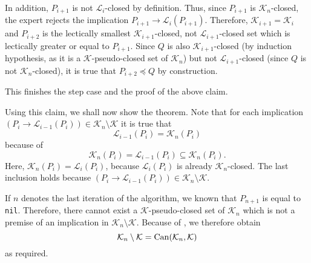 \begin{Proof}
  In addition, $P_{i+1}$ is not $\mathcal{L}_{i}$-closed by definition.  Thus, since
  $P_{i+1}$ is $\mathcal{K}_{n}$-closed, the expert rejects the implication $P_{i+1} \to
  \mathcal{L}_{i}(P_{i+1})$.  Therefore, $\mathcal{K}_{i+1} = \mathcal{K}_{i}$ and
  $P_{i+2}$ is the lectically smallest $\mathcal{K}_{i+1}$-closed, not
  $\mathcal{L}_{i+1}$-closed set which is lectically greater or equal to $P_{i+1}$.  Since
  $Q$ is also $\mathcal{K}_{i+1}$-closed (by induction hypothesis, as it is a
  $\mathcal{K}$-pseudo-closed set of $\mathcal{K}_{n}$) but not $\mathcal{L}_{i+1}$-closed
  (since $Q$ is not $\mathcal{K}_{n}$-closed), it is true that $P_{i+2} \preceq Q$ by
  construction.

  This finishes the step case and the proof of the above claim.

  Using this claim, we shall now show the theorem.  Note that for each implication $(P_{i}
  \to \mathcal{L}_{i-1}(P_{i})) \in \mathcal{K}_{n} \setminus \mathcal{K}$ it is true that
  \begin{equation}
    \label{eq:38}
    \mathcal{L}_{i-1}(P_{i}) = \mathcal{K}_{n}(P_{i})
  \end{equation}
  because of
  \begin{equation*}
    \mathcal{K}_{n}(P_{i}) = \mathcal{L}_{i-1}(P_{i}) \subseteq \mathcal{K}_{n}(P_{i}).
  \end{equation*}
  Here, $\mathcal{K}_{n}(P_{i}) = \mathcal{L}_{i}(P_{i})$, because
  $\mathcal{L}_{i}(P_{i})$ is already $\mathcal{K}_{n}$-closed.  The last inclusion holds
  because $(P_{i} \to \mathcal{L}_{i-1}(P_{i})) \in \mathcal{K}_{n} \setminus
  \mathcal{K}$.

  If $n$ denotes the last iteration of the algorithm, we known that $P_{n+1}$ is equal to
  \lstinline{nil}.  Therefore, there cannot exist a $\mathcal{K}$-pseudo-closed set of
  $\mathcal{K}_{n}$ which is not a premise of an implication in $\mathcal{K}_{n} \setminus
  \mathcal{K}$.  Because of , we therefore obtain
  \begin{equation*}
    \mathcal{K}_{n} \setminus \mathcal{K} = \operatorname{Can}(\mathcal{K}_{n}, \mathcal{K})
  \end{equation*}
  as required.
\end{Proof}

